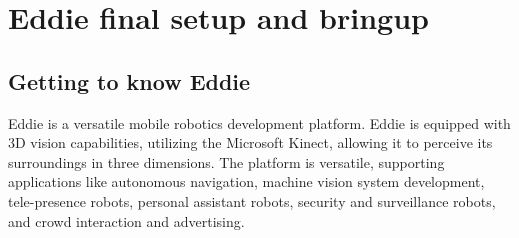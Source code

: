 \section{Eddie final setup and bringup}
\subsection{Getting to know Eddie}
Eddie is a versatile mobile robotics development platform. Eddie is equipped with 3D vision capabilities, utilizing the Microsoft Kinect, allowing it to perceive its surroundings in three dimensions. The platform is versatile, supporting applications like autonomous navigation, machine vision system development, tele-presence robots, personal assistant robots, security and surveillance robots, and crowd interaction and advertising. \\
\newline
